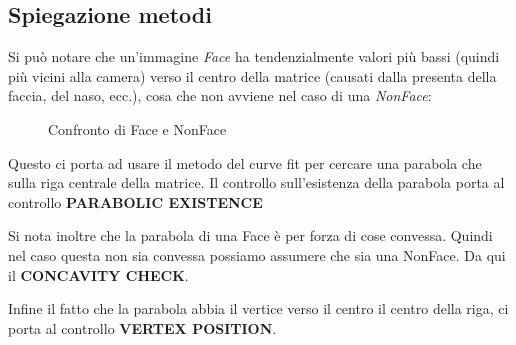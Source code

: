 \documentclass[
  italian,
]{article}
\begin{document}
\pagebreak

\hypertarget{spiegazione-metodi}{%
\subsection{Spiegazione metodi}\label{spiegazione-metodi}}

Si può notare che un'immagine \emph{Face} ha tendenzialmente valori più bassi
(quindi più vicini alla camera) verso il centro della matrice (causati
dalla presenta della faccia, del naso, ecc.), cosa che non avviene nel caso di una \emph{NonFace}:

\begin{figure}
\centering
{}%
\qquad
{}%
\caption{Confronto di Face e NonFace}
\end{figure}

Questo ci porta ad usare il metodo del curve fit per cercare una parabola che sulla riga centrale della matrice.
Il controllo sull'esistenza della parabola porta al controllo \textbf{PARABOLIC EXISTENCE}

Si nota inoltre che la parabola di una Face è per forza di cose convessa. Quindi nel caso questa non sia convessa possiamo assumere che sia una NonFace. Da qui il \textbf{CONCAVITY CHECK}.

Infine il fatto che la parabola abbia il vertice verso il centro il centro della riga, ci porta al controllo \textbf{VERTEX POSITION}.
\end{document}
